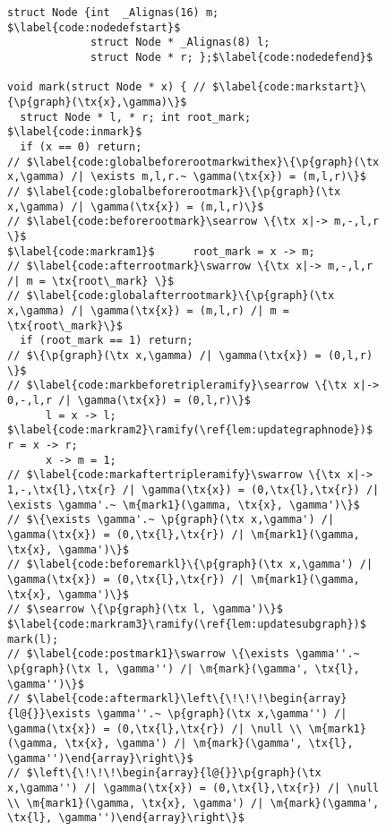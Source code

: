 \begin{figure}[htbp]
\vspace{-1ex}
  \begin{lstlisting}
struct Node {int  _Alignas(16) m; $\label{code:nodedefstart}$
             struct Node * _Alignas(8) l;
             struct Node * r; };$\label{code:nodedefend}$

void mark(struct Node * x) { // $\label{code:markstart}\{\p{graph}(\tx{x},\gamma)\}$
  struct Node * l, * r; int root_mark; $\label{code:inmark}$
  if (x == 0) return;
// $\label{code:globalbeforerootmarkwithex}\{\p{graph}(\tx x,\gamma) /| \exists m,l,r.~ \gamma(\tx{x}) = (m,l,r)\}$
// $\label{code:globalbeforerootmark}\{\p{graph}(\tx x,\gamma) /| \gamma(\tx{x}) = (m,l,r)\}$
// $\label{code:beforerootmark}\searrow \{\tx x|-> m,-,l,r \}$
$\label{code:markram1}$      root_mark = x -> m;
// $\label{code:afterrootmark}\swarrow \{\tx x|-> m,-,l,r /| m = \tx{root\_mark} \}$
// $\label{code:globalafterrootmark}\{\p{graph}(\tx x,\gamma) /| \gamma(\tx{x}) = (m,l,r) /| m = \tx{root\_mark}\}$
  if (root_mark == 1) return;
// $\{\p{graph}(\tx x,\gamma) /| \gamma(\tx{x}) = (0,l,r) \}$
// $\label{code:markbeforetripleramify}\searrow \{\tx x|-> 0,-,l,r /| \gamma(\tx{x}) = (0,l,r)\}$
      l = x -> l;
$\label{code:markram2}\ramify(\ref{lem:updategraphnode})$      r = x -> r;
      x -> m = 1;
// $\label{code:markaftertripleramify}\swarrow \{\tx x|-> 1,-,\tx{l},\tx{r} /| \gamma(\tx{x}) = (0,\tx{l},\tx{r}) /| \exists \gamma'.~ \m{mark1}(\gamma, \tx{x}, \gamma')\}$
// $\{\exists \gamma'.~ \p{graph}(\tx x,\gamma') /| \gamma(\tx{x}) = (0,\tx{l},\tx{r}) /| \m{mark1}(\gamma, \tx{x}, \gamma')\}$
// $\label{code:beforemarkl}\{\p{graph}(\tx x,\gamma') /| \gamma(\tx{x}) = (0,\tx{l},\tx{r}) /| \m{mark1}(\gamma, \tx{x}, \gamma')\}$
// $\searrow \{\p{graph}(\tx l, \gamma')\}$
$\label{code:markram3}\ramify(\ref{lem:updatesubgraph})$      mark(l);
// $\label{code:postmark1}\swarrow \{\exists \gamma''.~ \p{graph}(\tx l, \gamma'') /| \m{mark}(\gamma', \tx{l}, \gamma'')\}$
// $\label{code:aftermarkl}\left\{\!\!\!\begin{array}{l@{}}\exists \gamma''.~ \p{graph}(\tx x,\gamma'') /| \gamma(\tx{x}) = (0,\tx{l},\tx{r}) /| \null \\ \m{mark1}(\gamma, \tx{x}, \gamma') /| \m{mark}(\gamma', \tx{l}, \gamma'')\end{array}\right\}$
// $\left\{\!\!\!\begin{array}{l@{}}\p{graph}(\tx x,\gamma'') /| \gamma(\tx{x}) = (0,\tx{l},\tx{r}) /| \null \\ \m{mark1}(\gamma, \tx{x}, \gamma') /| \m{mark}(\gamma', \tx{l}, \gamma'')\end{array}\right\}$

\end{lstlisting}
\end{figure}
